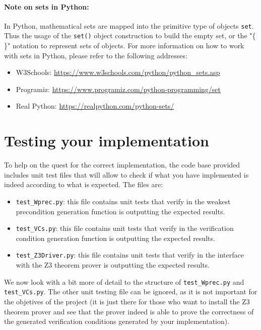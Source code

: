 \documentclass[11pt]{article}
\begin{document}
\paragraph{Note on sets in Python:} In Python, mathematical sets are mapped into the primitive type of objects \lstinline!set!. Thus the usage of the \lstinline!set()! object construction to build the empty set, or the "\{ \}" notation to represent sets of objects. For more information on how to work with sets in Python, please refer to the following addresses:
\begin{itemize}
  \item W3Schools: \url{https://www.w3schools.com/python/python_sets.asp}
  \item Programiz: \url{https://www.programiz.com/python-programming/set}
  \item Real Python: \url{https://realpython.com/python-sets/}
\end{itemize}

\section{Testing your implementation}

To help on the quest for the correct implementation, the code base provided includes unit test files that will allow to check if what you have implemented is indeed according to what is expected. The files are:
\begin{itemize}
  \item \texttt{test\_Wprec.py}: this file contains unit tests that verify in the weakest precondition generation function is outputting the expected results.
  \item \texttt{test\_VCs.py}: this file contains unit tests that verify in the verification condition generation function is outputting the expected results.
  \item \texttt{test\_Z3Driver.py}: this file contains unit tests that verify in the interface with the Z3 theorem prover is outputting the expected results.
\end{itemize}

We now look with a bit more of detail to the structure of \texttt{test\_Wprec.py} and \texttt{test\_VCs.py}. The other unit testing file can be ignored, as it is not important for the objetives of the project (it is just there for those who want to install the Z3 theorem prover and see that the prover indeed is able to prove the correctness of the generated verification conditions generated by your implementation).
\end{document}

